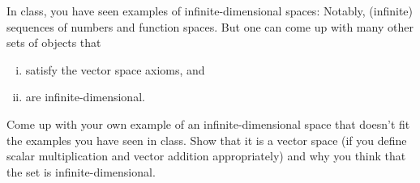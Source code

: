 \documentclass[12pt]{memoir}
\begin{document}
\begin{Ej}
    In class, you have seen examples of infinite-dimensional spaces: Notably, (infinite) sequences of numbers and function spaces. But one can come up with many other sets of objects that 
    \begin{enumerate}[(i)]
        \item satisfy the vector space axioms, and 
        \item are infinite-dimensional.
    \end{enumerate}
Come up with your own example of an infinite-dimensional space that doesn't fit the examples you have seen in class. Show
that it is a vector space (if you define scalar multiplication and vector addition appropriately) and why you
think that the set is infinite-dimensional.
\end{Ej}
\end{document}
